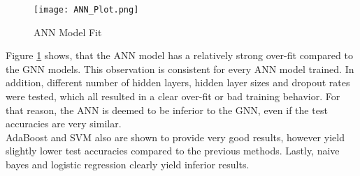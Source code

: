   \begin{figure}[h]
		\centering
		\texttt{[image: ANN\_Plot.png]}
		\caption{ANN Model Fit}
        \label{fig:ANN_fit}
  \end{figure}

  \noindent Figure \ref{fig:ANN_fit} shows, that the ANN model has a relatively
  strong over-fit compared to the GNN models. This observation is consistent
  for every ANN model trained. In addition, different number of hidden layers, 
  hidden layer sizes and dropout rates were tested, which all resulted in a 
  clear over-fit or bad training behavior. For that reason, the ANN is deemed
  to be inferior to the GNN, even if the test accuracies are very similar. \\

  \noindent AdaBoost and SVM also are shown to provide very good results,
  however yield slightly lower test accuracies compared to the previous
  methods. Lastly, naive bayes and logistic regression clearly yield inferior
  results. 
